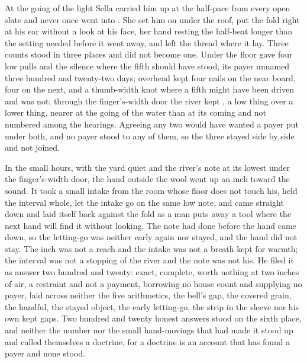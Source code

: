 \scenebreak

At the going of the light Sella carried him up at the half-pace from every open slate and never once went into . She set him on  under the roof, put the fold right at his ear without a look at his face, her hand resting the half-beat longer than the setting needed before it went away, and left the thread where it lay. Three counts stood in three places and did not become one. Under the floor  gave four low pulls and the silence where the fifth should have stood, its payer unnamed three hundred and twenty-two days; overhead  kept four nails on the near board, four on the next, and a thumb-width knot where a fifth might have been driven and was not; through the finger's-width door the river kept , a low thing over a lower thing, nearer at the going of the water than at its coming and not numbered among the hearings. Agreeing any two would have wanted a payer put under both, and no payer stood to any of them, so the three stayed side by side and not joined.

In the small hours, with the yard quiet and the river's note at its lowest under the finger's-width door, the hand outside the wool went up an inch toward the sound. It took a small intake from the room whose floor does not touch his, held the interval whole, let the intake go on the same low note, and came straight down and laid itself back against the fold as a man puts away a tool where the next hand will find it without looking. The note had done before the hand came down, so the letting-go was neither early again nor stayed, and the hand did not stay. The inch was not a reach and the intake was not a breath kept for warmth; the interval was not a stopping of the river and the note was not his. He filed it as answer two hundred and twenty: exact, complete, worth nothing at two inches of air, a restraint and not a payment, borrowing no house count and supplying no payer, laid across neither the five arithmetics, the bell's gap, the covered grain, the handful, the stayed object, the early letting-go, the strip in the sleeve nor his own kept gaps. Two hundred and twenty honest answers stood on the sixth place, and neither the number nor the small hand-movings that had made it stood up and called themselves a doctrine, for a doctrine is an account that has found a payer and none stood.

